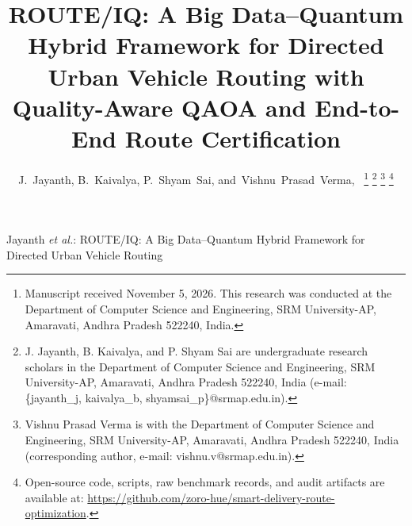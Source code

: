 \documentclass[journal,10pt]{IEEEtran}
\begin{document}
\title{ROUTE/IQ: A Big Data--Quantum Hybrid Framework for Directed Urban Vehicle Routing with Quality-Aware QAOA and End-to-End Route Certification}

\author{J.~Jayanth, 
        B.~Kaivalya, 
        P.~Shyam~Sai, 
        and~Vishnu~Prasad~Verma,~%
\thanks{Manuscript received November 5, 2026. This research was conducted at the Department of Computer Science and Engineering, SRM University-AP, Amaravati, Andhra Pradesh 522240, India.}%
\thanks{J. Jayanth, B. Kaivalya, and P. Shyam Sai are undergraduate research scholars in the Department of Computer Science and Engineering, SRM University-AP, Amaravati, Andhra Pradesh 522240, India (e-mail: \{jayanth\_j, kaivalya\_b, shyamsai\_p\}@srmap.edu.in).}%
\thanks{Vishnu Prasad Verma is with the Department of Computer Science and Engineering, SRM University-AP, Amaravati, Andhra Pradesh 522240, India (corresponding author, e-mail: vishnu.v@srmap.edu.in).}%
\thanks{Open-source code, scripts, raw benchmark records, and audit artifacts are available at: \url{https://github.com/zoro-hue/smart-delivery-route-optimization}.}}

%
{Jayanth \MakeLowercase{\textit{et al.}}: ROUTE/IQ: A Big Data--Quantum Hybrid Framework for Directed Urban Vehicle Routing}

\maketitle
\end{document}
